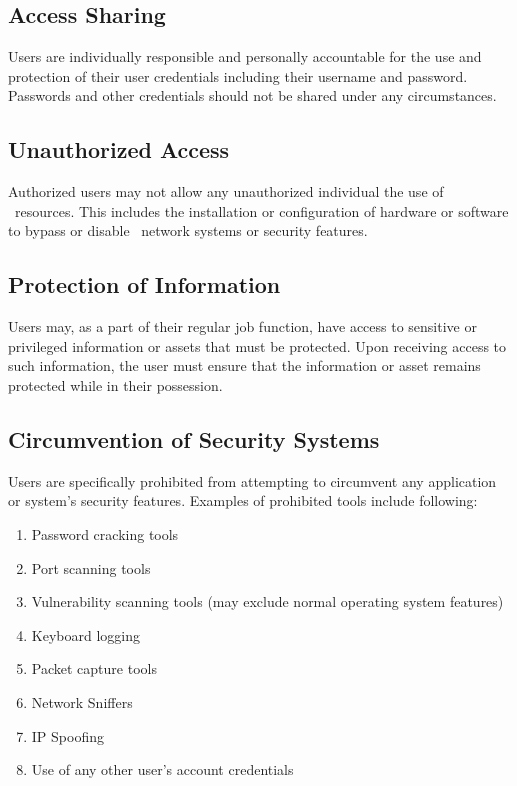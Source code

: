 \documentclass[use]{policy}
\begin{document}
		\subsection{Access Sharing}
			Users are individually responsible and personally accountable for the use and protection of their user credentials including their username and password.  Passwords and other credentials should not be shared under any circumstances.
		
		\subsection{Unauthorized Access}
			Authorized users may not allow any unauthorized individual the use of \theOrganization\  resources.  This includes the installation or configuration of hardware or software to bypass or disable \theOrganization\  network systems or security features.
		
		\subsection{Protection of Information}
			Users may, as a part of their regular job function, have access to sensitive or privileged information or assets that must be protected.  Upon receiving access to such information, the user must ensure that the information or asset remains protected while in their possession.
	
		\subsection{Circumvention of Security Systems}
			Users are specifically prohibited from attempting to circumvent any application or system’s security features.  Examples of prohibited tools include following:
			\begin{enumerate}[label=\alph*)]
				\item Password cracking tools
				\item Port scanning tools
				\item Vulnerability scanning tools (may exclude normal operating system features)
				\item Keyboard logging
				\item Packet capture tools
				\item Network Sniffers
				\item IP Spoofing
				\item Use of any other user’s account credentials
			\end{enumerate}
			
\end{document}
